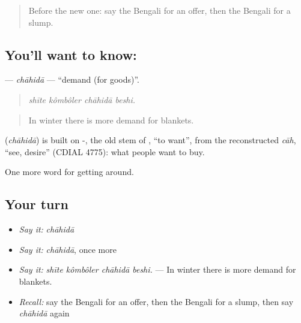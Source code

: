 \begin{quote}
Before the new one: say the Bengali for an offer, then the Bengali for a slump.
\end{quote}

\subsection*{You'll want to know: }
\textbf{} — \emph{chāhidā} — \textquotedblleft{}demand (for goods)\textquotedblright{}.

\begin{quote}
   
\end{quote}

\begin{quote}
\emph{shīte kômbôler chāhidā beshi.}
\end{quote}

\begin{quote}
In winter there is more demand for blankets.
\end{quote}

\begin{cousinweb}
\textbf{} (\emph{chāhidā}) is built on -, the old stem of \textbf{}, \textquotedblleft{}to want\textquotedblright{}, from the reconstructed \emph{cāh}, \textquotedblleft{}see, desire\textquotedblright{} (CDIAL 4775): what people want to buy.
\end{cousinweb}

\begin{grammarlens}[title={What you've built}]
One more word for getting around.
\end{grammarlens}

\subsection*{Your turn}
\begin{itemize}
\raggedright
  \item \emph{Say it:} \emph{chāhidā}
  \item \emph{Say it:} \emph{chāhidā}, once more
  \item \emph{Say it:} \emph{shīte kômbôler chāhidā beshi.} — In winter there is more demand for blankets.
  \item \emph{Recall:} say the Bengali for an offer, then the Bengali for a slump, then say \emph{chāhidā} again
\end{itemize}


